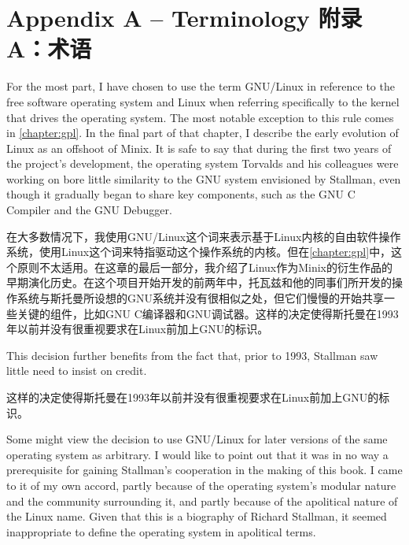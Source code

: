 

\chapter{\ifdefined\eng
Appendix A -- Terminology
\fi
\ifdefined\chs
附录A：术语
\fi
}

\ifdefined\eng
For the most part, I have chosen to use the term GNU/Linux in reference to the free software operating system and Linux when referring specifically to the kernel that drives the operating system. The most notable exception to this rule comes in \autoref{chapter:gpl}. In the final part of that chapter, I describe the early evolution of Linux as an offshoot of Minix. It is safe to say that during the first two years of the project's development, the operating system Torvalds and his colleagues were working on bore little similarity to the GNU system envisioned by Stallman, even though it gradually began to share key components, such as the GNU C Compiler and the GNU Debugger.
\fi

\ifdefined\chs
在大多数情况下，我使用GNU/Linux这个词来表示基于Linux内核的自由软件操作系统，使用Linux这个词来特指驱动这个操作系统的内核。但在\autoref{chapter:gpl}中，这个原则不太适用。在这章的最后一部分，我介绍了Linux作为Minix的衍生作品的早期演化历史。在这个项目开始开发的前两年中，托瓦兹和他的同事们所开发的操作系统与斯托曼所设想的GNU系统并没有很相似之处，但它们慢慢的开始共享一些关键的组件，比如GNU C编译器和GNU调试器。这样的决定使得斯托曼在1993年以前并没有很重视要求在Linux前加上GNU的标识。
\fi

\ifdefined\eng
This decision further benefits from the fact that, prior to 1993, Stallman saw little need to insist on credit.
\fi

\ifdefined\chs
这样的决定使得斯托曼在1993年以前并没有很重视要求在Linux前加上GNU的标识。
\fi

\ifdefined\eng
Some might view the decision to use GNU/Linux for later versions of the same operating system as arbitrary. I would like to point out that it was in no way a prerequisite for gaining Stallman's cooperation in the making of this book. I came to it of my own accord, partly because of the operating system's modular nature and the community surrounding it, and partly because of the apolitical nature of the Linux name. Given that this is a biography of Richard Stallman, it seemed inappropriate to define the operating system in apolitical terms.
\fi


